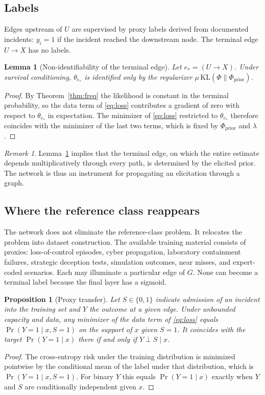\documentclass[11pt]{article}
\newtheorem{lemma}{Lemma}[section]
\newtheorem{proposition}{Proposition}[section]
\theoremstyle{remark}
\newtheorem{remark}{Remark}[section]
\begin{document}
\subsection{Labels}

Edges upstream of $U$ are supervised by proxy labels derived from documented incidents: $y_i=1$ if the incident reached the downstream node. The terminal edge $U\to X$ has no labels.

\begin{lemma}[Non-identifiability of the terminal edge]\label{lem:terminal}
Let $e_\ast=(U\to X)$. Under survival conditioning, $\theta_{e_\ast}$ is identified only by the regularizer $\mu\,\mathrm{KL}(\Phi\|\Phi_{\mathrm{prior}})$.
\end{lemma}
\begin{proof}
By Theorem~\ref{thm:freq} the likelihood is constant in the terminal probability, so the data term of \eqref{eq:loss} contributes a gradient of zero with respect to $\theta_{e_\ast}$ in expectation. The minimizer of \eqref{eq:loss} restricted to $\theta_{e_\ast}$ therefore coincides with the minimizer of the last two terms, which is fixed by $\Phi_{\mathrm{prior}}$ and $\lambda$. \qedhere
\end{proof}

\begin{remark}
Lemma~\ref{lem:terminal} implies that the terminal edge, on which the entire estimate depends multiplicatively through every path, is determined by the elicited prior. The network is thus an instrument for propagating an elicitation through a graph.
\end{remark}

\subsection{Where the reference class reappears}

The network does not eliminate the reference-class problem. It relocates the problem into dataset construction. The available training material consists of proxies: loss-of-control episodes, cyber propagation, laboratory containment failures, strategic deception tests, simulation outcomes, near misses, and expert-coded scenarios. Each may illuminate a particular edge of $G$. None can become a terminal label because the final layer has a sigmoid.

\begin{proposition}[Proxy transfer]\label{prop:proxy}
Let $S\in\{0,1\}$ indicate admission of an incident into the training set and $Y$ the outcome at a given edge. Under unbounded capacity and data, any minimizer of the data term of \eqref{eq:loss} equals $\Pr(Y=1\mid x,S=1)$ on the support of $x$ given $S=1$. It coincides with the target $\Pr(Y=1\mid x)$ there if and only if $Y\perp S\mid x$.
\end{proposition}
\begin{proof}
The cross-entropy risk under the training distribution is minimized pointwise by the conditional mean of the label under that distribution, which is $\Pr(Y=1\mid x,S=1)$. For binary $Y$ this equals $\Pr(Y=1\mid x)$ exactly when $Y$ and $S$ are conditionally independent given $x$. \qedhere
\end{proof}
\end{document}
